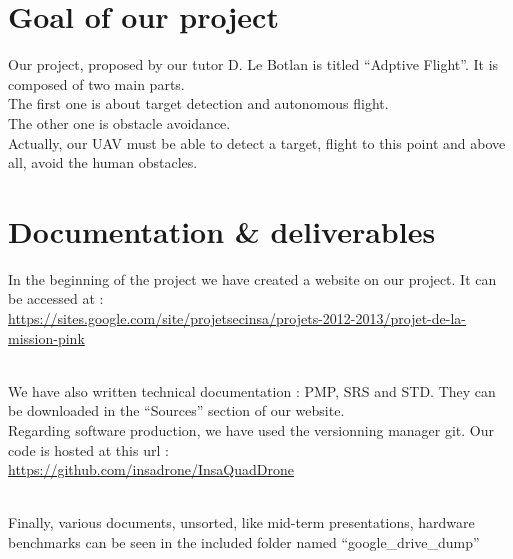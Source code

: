 \section{Goal of our project}

Our project, proposed by our tutor D. Le Botlan is titled ``Adptive Flight''.
It is composed of two main parts.\\

The first one is about target detection and autonomous flight.\\
The other one is obstacle avoidance.\\

Actually, our UAV must be able to detect a target, flight to this point and above all, avoid the human obstacles.\\

\section{Documentation \& deliverables}

In the beginning of the project we have created a website on our project. It can be accessed at :\\

\url{https://sites.google.com/site/projetsecinsa/projets-2012-2013/projet-de-la-mission-pink}

~~\\

We have also written technical documentation : PMP, SRS and STD. They can be downloaded in the ``Sources'' section of our website.\\

Regarding software production, we have used the versionning manager git. Our code is hosted at this url :\\

\url{https://github.com/insadrone/InsaQuadDrone}

~~\\

Finally, various documents, unsorted, like mid-term presentations, hardware benchmarks can be seen in the included folder named ``google\_drive\_dump''




